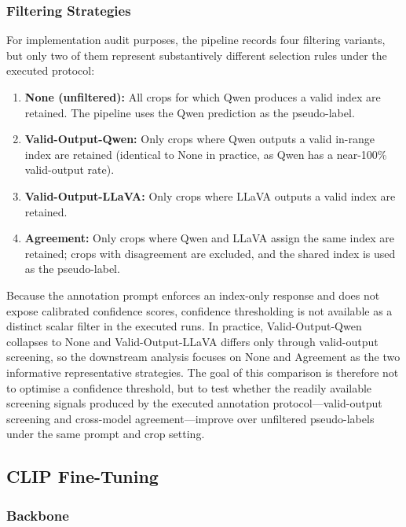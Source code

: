 \documentclass[10pt,letterpaper]{article}
\begin{document}
\subsubsection*{Filtering Strategies}

For implementation audit purposes, the pipeline records four filtering
variants, but only two of them represent substantively different
selection rules under the executed protocol:

\begin{enumerate}
    \item \textbf{None (unfiltered):} All crops for which Qwen
    produces a valid index are retained.
    The pipeline uses the Qwen prediction as the pseudo-label.

    \item \textbf{Valid-Output-Qwen:} Only crops where Qwen outputs
    a valid in-range index are retained (identical to None in
    practice, as Qwen has a near-100\% valid-output rate).

    \item \textbf{Valid-Output-LLaVA:} Only crops where LLaVA outputs
    a valid index are retained.

    \item \textbf{Agreement:} Only crops where Qwen and LLaVA assign
    the same index are retained; crops with disagreement are excluded,
    and the shared index is used as the pseudo-label.
\end{enumerate}

Because the annotation prompt enforces an index-only response and does
not expose calibrated confidence scores, confidence thresholding is not
available as a distinct scalar filter in the executed runs.
In practice, Valid-Output-Qwen collapses to None and Valid-Output-LLaVA
differs only through valid-output screening, so the
downstream analysis focuses on None and Agreement as the two
informative representative strategies.
The goal of this comparison is therefore not to optimise a confidence
threshold, but to test whether the readily available screening signals
produced by the executed annotation protocol---valid-output screening
and cross-model agreement---improve over unfiltered pseudo-labels under
the same prompt and crop setting.

\subsection*{CLIP Fine-Tuning}
\label{sec:finetune}

\subsubsection*{Backbone}
\end{document}
